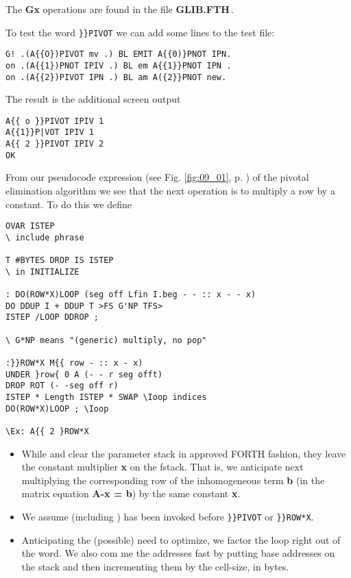 The \textbf{Gx} operations are found in the file \textbf{GLIB.FTH}\,.

To test the word \verb|}}PIVOT| we can add some lines to the test file:

\begin{verbatim}
G! .(A{{O})PIVOT mv .) BL EMIT A{{0)}PNOT IPN.
on .(A{{1})PNOT IPIV .) BL em A{{1}}PNOT IPN .
on .(A{{2})PIVOT IPN .) BL am A({2}}PNOT new.
\end{verbatim}
The result is the additional screen output


\begin{verbatim}
A{{ o }}PIVOT IPIV 1
A{{1}}P|VOT IPIV 1
A{{ 2 }}PIVOT IPIV 2
OK
\end{verbatim}

From our pseudocode expression (see Fig. \ref{fig:09_01}, p. \pageref{fig:09_01}) of the
pivotal elimination algorithm we see that the next operation is to
multiply a row by a constant. To do this we define

\begin{verbatim}
OVAR ISTEP
\ include phrase

T #BYTES DROP IS ISTEP
\ in INITIALIZE

: DO(ROW*X)LOOP (seg off Lfin I.beg - - :: x - - x)
DO DDUP I + DDUP T >FS G'NP TFS>
ISTEP /LOOP DDROP ;

\ G*NP means "(generic) multiply, no pop"

:}}ROW*X M{{ row - :: x - x)
UNDER }row{ 0 A (- - r seg offt)
DROP ROT (- -seg off r)
ISTEP * Length ISTEP * SWAP \Ioop indices
DO(ROW*X)LOOP ; \Ioop

\Ex: A{{ 2 }ROW*X

\end{verbatim}

\begin{itemize}
	\item  While  and  clear the parameter stack in approved FORTH fashion, they leave the constant
		multiplier \textbf{x} on the fstack. That is, we anticipate next multiplying the corresponding row of the inhomogeneous term \textbf{b} (in
		the matrix equation \textbf{A-x = b}) by the same constant \textbf{x}.
	\item We assume  (including ) has been
		invoked before \verb|}}PIVOT| or \verb|}}ROW*X|.
  \item Anticipating the (possible) need to optimize, we factor the loop
right out of the word. We also com me the addresses fast by
putting base addresses on the stack and then incrementing
them by the cell-size, in bytes.
\end{itemize}

